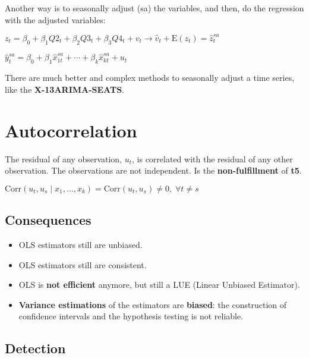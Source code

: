 \documentclass[10pt, a4paper, landscape]{article}
\newcommand{\E}{\mathrm{E}}
\newcommand{\Corr}{\mathrm{Corr}}
\begin{document}
\begin{multicols}{3}
		Another way is to seasonally adjust (sa) the variables, and then, do the regression with the adjusted variables:
		
		\begin{center}
			$z_{t} = \beta_{0} + \beta_{1} Q2_{t} + \beta_{2} Q3_{t} + \beta_{3} Q4_{t} + v_{t} \rightarrow \hat{v}_{t} + \E(z_{t}) = \hat{z}_{t}^{sa}$
			
			$\hat{y}_{t}^{sa}= \beta_{0} + \beta_{1} \hat{x}_{1t}^{sa} + \cdots + \beta_{k} \hat{x}_{kt}^{sa} + u_{t}$
		\end{center}
		
		There are much better and complex methods to seasonally adjust a time series, like the \textbf{X-13ARIMA-SEATS}.
		
		\columnbreak
		
		\section*{Autocorrelation}
		
		The residual of any observation, $u_{t}$, is correlated with the residual of any other observation. The observations are not independent. Is the \textbf{non-fulfillment} of \textbf{t5}.
		
		\begin{center}
			$\Corr(u_{t}, u_{s} \mid x_{1}, \ldots, x_{k}) = \Corr(u_{t}, u_{s}) \neq 0, \; \forall t \neq s$
		\end{center}
		
		\subsection*{Consequences}
		
		\begin{itemize}[leftmargin=*]
			\item OLS estimators still are unbiased.
			\item OLS estimators still are consistent.
			\item OLS is \textbf{not efficient} anymore, but still a LUE (Linear Unbiased Estimator).
			\item \textbf{Variance estimations} of the estimators are \textbf{biased}: the construction of confidence intervals and the hypothesis testing is not reliable.
		\end{itemize}
		
		\subsection*{Detection}
		

\end{multicols}
\end{document}
